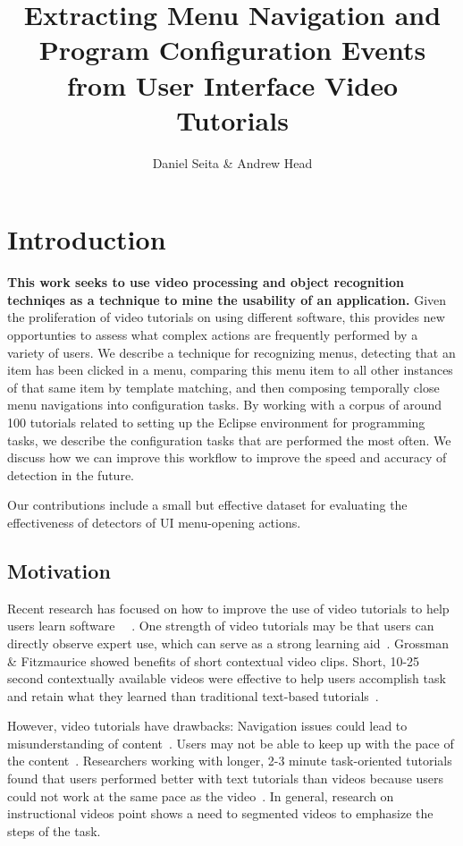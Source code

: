 \documentclass[12pt]{memoir}
\title{Extracting Menu Navigation and Program Configuration Events 
from User Interface Video Tutorials}
\author{Daniel Seita \& Andrew Head}
\begin{document}
\maketitle

\section{Introduction}

\textbf{This work seeks to use video processing and object recognition techniqes as
a technique to mine the usability of an application.}  Given the proliferation
of video tutorials on using different software, this provides new opportunties
to assess what complex actions are frequently performed by a variety of users.
We describe a technique for recognizing menus, detecting that an item has
been clicked in a menu, comparing this menu item to all other instances of
that same item by template matching, and then composing temporally close
menu navigations into configuration tasks.  By working with a corpus of
around 100 tutorials related to setting up the Eclipse environment for
programming tasks, we describe the configuration tasks that are performed
the most often.  We discuss how we can improve this workflow to improve the
speed and accuracy of detection in the future.

Our contributions include a small but effective dataset for evaluating
the effectiveness of detectors of UI menu-opening actions.

\subsection{Motivation}

Recent research has focused on how to improve the use of video tutorials 
to help users learn software ~\cite{matejka_ambient_2011}~\cite{pongnumkul_pause-and-play_2011}.  
One strength of video tutorials may be that users
can directly observe expert use, which can serve as a strong learning aid~\cite{shneiderman_direct_1983}.  Grossman \& Fitzmaurice showed benefits of short 
contextual video clips.  Short, 10-25 second 
contextually available videos were effective to help users accomplish task and 
retain what they learned than traditional text-based tutorials~\cite{grossman_toolclips_2010}.

However, video tutorials have drawbacks:
Navigation issues could lead to misunderstanding of content~\cite{harrison_comparison_1995}.
Users may not be able to keep up with the pace of the content~\cite{palmiter_evaluation_1991}.
Researchers working with longer, 2-3 minute 
task-oriented tutorials found that users performed better with text tutorials 
than videos because users could not work at the same pace as the video~\cite{grabler_generating_2009}.
In general, research on instructional videos point shows a need to segmented videos to
emphasize the steps of the task.
\end{document}
